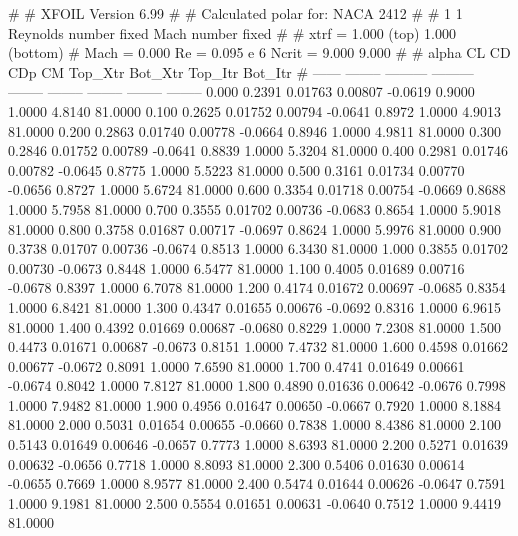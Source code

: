 #  
#       XFOIL         Version 6.99
#  
# Calculated polar for: NACA 2412                                       
#  
# 1 1 Reynolds number fixed          Mach number fixed         
#  
# xtrf =   1.000 (top)        1.000 (bottom)  
# Mach =   0.000     Re =     0.095 e 6     Ncrit =   9.000  9.000
#  
#   alpha    CL        CD       CDp       CM     Top_Xtr  Bot_Xtr  Top_Itr  Bot_Itr
#  ------ -------- --------- --------- -------- -------- -------- -------- --------
   0.000   0.2391   0.01763   0.00807  -0.0619   0.9000   1.0000   4.8140  81.0000
   0.100   0.2625   0.01752   0.00794  -0.0641   0.8972   1.0000   4.9013  81.0000
   0.200   0.2863   0.01740   0.00778  -0.0664   0.8946   1.0000   4.9811  81.0000
   0.300   0.2846   0.01752   0.00789  -0.0641   0.8839   1.0000   5.3204  81.0000
   0.400   0.2981   0.01746   0.00782  -0.0645   0.8775   1.0000   5.5223  81.0000
   0.500   0.3161   0.01734   0.00770  -0.0656   0.8727   1.0000   5.6724  81.0000
   0.600   0.3354   0.01718   0.00754  -0.0669   0.8688   1.0000   5.7958  81.0000
   0.700   0.3555   0.01702   0.00736  -0.0683   0.8654   1.0000   5.9018  81.0000
   0.800   0.3758   0.01687   0.00717  -0.0697   0.8624   1.0000   5.9976  81.0000
   0.900   0.3738   0.01707   0.00736  -0.0674   0.8513   1.0000   6.3430  81.0000
   1.000   0.3855   0.01702   0.00730  -0.0673   0.8448   1.0000   6.5477  81.0000
   1.100   0.4005   0.01689   0.00716  -0.0678   0.8397   1.0000   6.7078  81.0000
   1.200   0.4174   0.01672   0.00697  -0.0685   0.8354   1.0000   6.8421  81.0000
   1.300   0.4347   0.01655   0.00676  -0.0692   0.8316   1.0000   6.9615  81.0000
   1.400   0.4392   0.01669   0.00687  -0.0680   0.8229   1.0000   7.2308  81.0000
   1.500   0.4473   0.01671   0.00687  -0.0673   0.8151   1.0000   7.4732  81.0000
   1.600   0.4598   0.01662   0.00677  -0.0672   0.8091   1.0000   7.6590  81.0000
   1.700   0.4741   0.01649   0.00661  -0.0674   0.8042   1.0000   7.8127  81.0000
   1.800   0.4890   0.01636   0.00642  -0.0676   0.7998   1.0000   7.9482  81.0000
   1.900   0.4956   0.01647   0.00650  -0.0667   0.7920   1.0000   8.1884  81.0000
   2.000   0.5031   0.01654   0.00655  -0.0660   0.7838   1.0000   8.4386  81.0000
   2.100   0.5143   0.01649   0.00646  -0.0657   0.7773   1.0000   8.6393  81.0000
   2.200   0.5271   0.01639   0.00632  -0.0656   0.7718   1.0000   8.8093  81.0000
   2.300   0.5406   0.01630   0.00614  -0.0655   0.7669   1.0000   8.9577  81.0000
   2.400   0.5474   0.01644   0.00626  -0.0647   0.7591   1.0000   9.1981  81.0000
   2.500   0.5554   0.01651   0.00631  -0.0640   0.7512   1.0000   9.4419  81.0000
